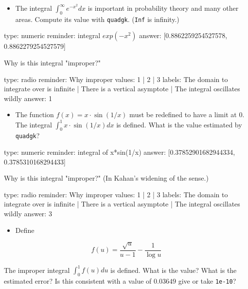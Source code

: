 \documentclass[12pt]{article}
\begin{document}
\begin{itemize}
\itemsep1pt\parskip0pt
\item
  The integral $\int_0^\infty e^{-x^2} dx$ is important in probability
  theory and many other areas. Compute its value with \texttt{quadgk}.
  (\texttt{Inf} is infinity.)
\end{itemize}

\begin{answer}
    type: numeric
    reminder: integral \( exp(-x^2) \)
    answer: [0.8862259254527578, 0.8862279254527579]

\end{answer}

Why is this integral "improper?"

\begin{answer}
type: radio
reminder: Why improper
values: 1 | 2 | 3
labels: The domain to integrate over is infinite | There is a vertical asymptote | The integral oscillates wildly
answer: 1
\end{answer}

\begin{itemize}
\itemsep1pt\parskip0pt
\item
  The function $f(x) = x \cdot \sin(1/x)$ must be redefined to have a
  limit at $0$. The integral $\int_0^1 x \cdot \sin(1/x)dx$ is defined.
  What is the value estimated by \texttt{quadgk}?
\end{itemize}

\begin{answer}
    type: numeric
    reminder: integral of x*sin(1/x)
    answer: [0.37852901682944334, 0.3785310168294433]

\end{answer}

Why is this integral "improper?" (In Kahan's widening of the sense.)

\begin{answer}
type: radio
reminder: Why improper
values: 1 | 2 | 3
labels: The domain to integrate over is infinite | There is a vertical asymptote | The integral oscillates wildly
answer: 3
\end{answer}

\begin{itemize}
\itemsep1pt\parskip0pt
\item
  Define
\end{itemize}

\[
f(u) = \frac{\sqrt{u}}{u-1} - \frac{1}{\log{u}}
\]

The improper integral $\int_0^1 f(u) du$ is defined. What is the value?
What is the estimated error? Is this consistent with a value of
$0.03649$ give or take \texttt{1e-10}?
\end{document}
